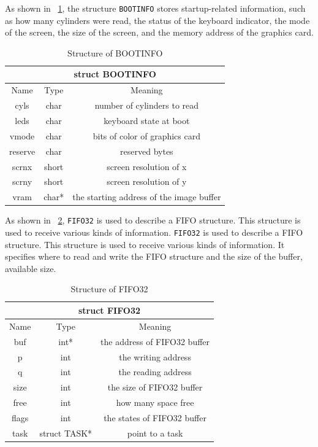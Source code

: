 \documentclass{swfcthesis}
\begin{document}
As shown in ~\ref{tab:BOOTINFO}, the structure \texttt{BOOTINFO} stores startup-related information, such as how many cylinders were
read, the status of the keyboard indicator, the mode of the screen, the size of the
screen, and the memory address of the graphics card.
\begin{table}[h!]
  \centering
  \begin{tabular}[c]{|c|c|c|}
    \hline
    \multicolumn{3}{|c|}{struct BOOTINFO} \\
    \hline
    Name & Type & Meaning \\ \hline
    cyls & char & number of cylinders to read \\
    \hline
    leds & char & keyboard state at boot \\
    \hline
    vmode & char & bits of color of graphics card \\
    \hline
    reserve & char & reserved bytes \\
    \hline
    scrnx & short & screen resolution of x\\
    \hline
    scrny & short & screen resolution of y\\
    \hline
    vram & char* & the starting address of the image buffer \\
    \hline
  \end{tabular}
  \caption{Structure of BOOTINFO}
  \label{tab:BOOTINFO}
\end{table}

As shown in ~\ref{tab:FIFO32}, \texttt{FIFO32} is used to describe a FIFO structure. This
structure is used to receive various kinds of information. \texttt{FIFO32} is used to
describe a FIFO structure. This structure is used to receive various kinds of
information. It specifies where to read and write the FIFO structure and the size of the
buffer, available size.

\begin{table}[!htbp]
  \centering
  \begin{tabular}[l]{|c|c|c|}
    \hline
    \multicolumn{3}{|c|}{struct FIFO32} \\
    \hline
    Name & Type & Meaning \\ \hline
    buf & int* & the address of FIFO32 buffer\\
    \hline
    p & int & the writing address \\
    \hline
    q & int & the reading address \\
    \hline
    size & int & the size of FIFO32 buffer \\
    \hline
    free & int & how many space free \\
    \hline
    flags & int & the states of FIFO32 buffer \\
    \hline
    task & struct TASK* & point to a task \\
    \hline
  \end{tabular}
  \caption{Structure of FIFO32}
  \label{tab:FIFO32}
\end{table}
\end{document}

